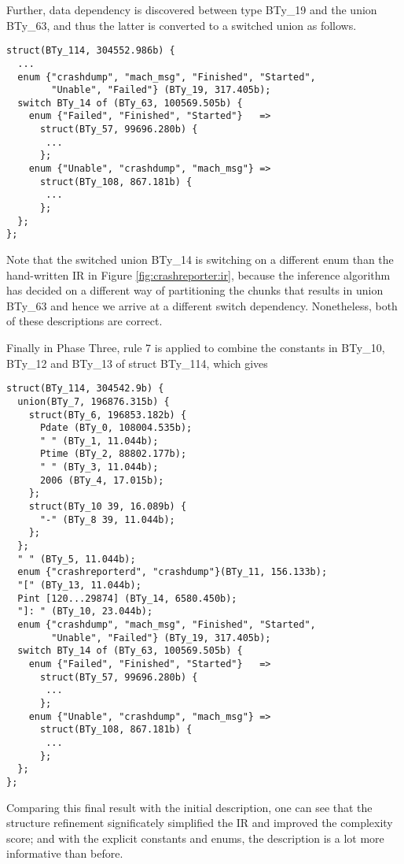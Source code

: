 Further, data dependency is discovered between type BTy\_19
and the union BTy\_63, and thus the latter is converted to
a switched union as follows.

{\small
\begin{verbatim}
struct(BTy_114, 304552.986b) {
  ...
  enum {"crashdump", "mach_msg", "Finished", "Started", 
        "Unable", "Failed"} (BTy_19, 317.405b);
  switch BTy_14 of (BTy_63, 100569.505b) {
    enum {"Failed", "Finished", "Started"}   => 
      struct(BTy_57, 99696.280b) {
       ...
      };
    enum {"Unable", "crashdump", "mach_msg"} =>
      struct(BTy_108, 867.181b) {
       ...
      };
  };
};
\end{verbatim}
}

Note that the switched union BTy\_14 is switching on a different enum 
than the hand-written IR in Figure \ref{fig:crashreporter:ir}, because
the inference algorithm has decided on a different way of partitioning
the chunks that results in union BTy\_63 and hence we arrive at a 
different switch dependency. Nonetheless, both of these descriptions are
correct. 

Finally in Phase Three, rule 7 is applied to combine the constants in BTy\_10,
BTy\_12 and BTy\_13 of struct BTy\_114, which gives 

{\small
\begin{verbatim}
struct(BTy_114, 304542.9b) {
  union(BTy_7, 196876.315b) {
    struct(BTy_6, 196853.182b) {
      Pdate (BTy_0, 108004.535b);
      " " (BTy_1, 11.044b);
      Ptime (BTy_2, 88802.177b);
      " " (BTy_3, 11.044b);
      2006 (BTy_4, 17.015b);
    };
    struct(BTy_10 39, 16.089b) {
      "-" (BTy_8 39, 11.044b);
    };
  };
  " " (BTy_5, 11.044b);
  enum {"crashreporterd", "crashdump"}(BTy_11, 156.133b);
  "[" (BTy_13, 11.044b);
  Pint [120...29874] (BTy_14, 6580.450b);
  "]: " (BTy_10, 23.044b);
  enum {"crashdump", "mach_msg", "Finished", "Started", 
        "Unable", "Failed"} (BTy_19, 317.405b);
  switch BTy_14 of (BTy_63, 100569.505b) {
    enum {"Failed", "Finished", "Started"}   => 
      struct(BTy_57, 99696.280b) {
       ...
      };
    enum {"Unable", "crashdump", "mach_msg"} =>
      struct(BTy_108, 867.181b) {
       ...
      };
  };
};
\end{verbatim}
}

Comparing this final result with the initial description, one can see that
the structure refinement significately simplified the IR and improved the
complexity score; and with
the explicit constants and enums, the description is a lot more
informative than before.
